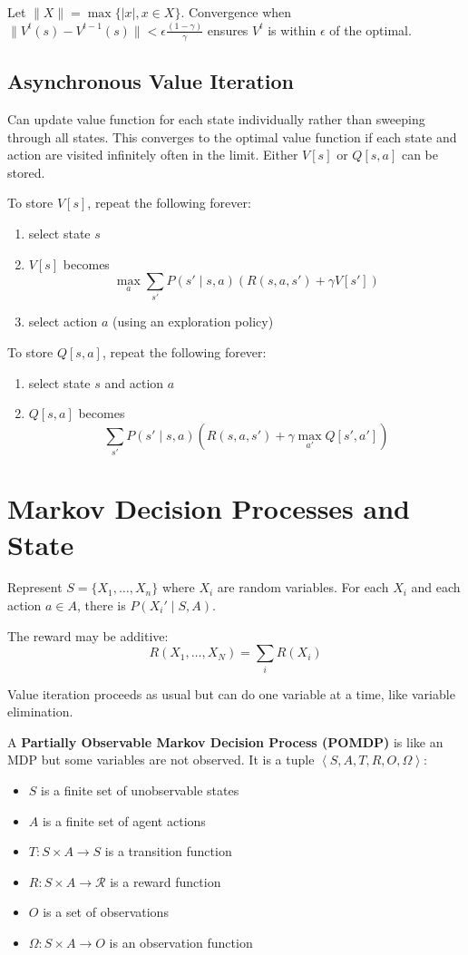 \documentclass[11pt]{article}
\begin{document}
Let \(\| X \| = \max \{ |x|, x \in X \}\).
Convergence when \(\| V^{t}(s) - V^{t-1}(s) \| < \epsilon \frac{(1-\gamma)}{\gamma}\) ensures
\(V^{t}\) is within \(\epsilon\) of the optimal.
\subsection{Asynchronous Value Iteration}
\label{sec:org2e1f15e}
Can update value function for each state individually rather than sweeping through all states.
This converges to the optimal value function if each state and action are visited
infinitely often in the limit.
Either \(V[s]\) or \(Q[s, a]\) can be stored.

To store \(V[s]\), repeat the following forever:
\begin{enumerate}
\item select state \(s\)
\item \(V[s]\) becomes
$$ \max_{a} \sum_{s'} P(s' \mid s, a) (R(s, a, s') + \gamma V[s']) $$
\item select action \(a\) (using an exploration policy)
\end{enumerate}

To store \(Q[s,a]\), repeat the following forever:
\begin{enumerate}
\item select state \(s\) and action \(a\)
\item \(Q[s, a]\) becomes
$$\sum_{s'} P(s' \mid s, a) \left( R(s, a, s') + \gamma \max_{a'} Q[s', a'] \right) $$
\end{enumerate}
\section{Markov Decision Processes and State}
\label{sec:orgeb360b0}
Represent \(S = \{X_{1}, \dots, X_{n}\}\) where \(X_{i}\) are random variables.
For each \(X_{i}\) and each action \(a \in A\), there is \(P(X_{i}' \mid S, A)\).

The reward may be additive:
$$ R(X_{1}, \dots, X_{N}) = \sum_{i} R(X_{i}) $$

Value iteration proceeds as usual but can do one variable at a time, like
variable elimination.

A \textbf{Partially Observable Markov Decision Process (POMDP)} is like an MDP but
some variables are not observed.
It is a tuple \(\left< S, A, T, R, O, \Omega \right>\):
\begin{itemize}
\item \(S\) is a finite set of unobservable states
\item \(A\) is a finite set of agent actions
\item \(T : S \times A \to S\) is a transition function
\item \(R : S \times A \to \mathcal{R}\) is a reward function
\item \(O\) is a set of observations
\item \(\Omega : S \times A \to O\) is an observation function
\end{itemize}
\end{document}
